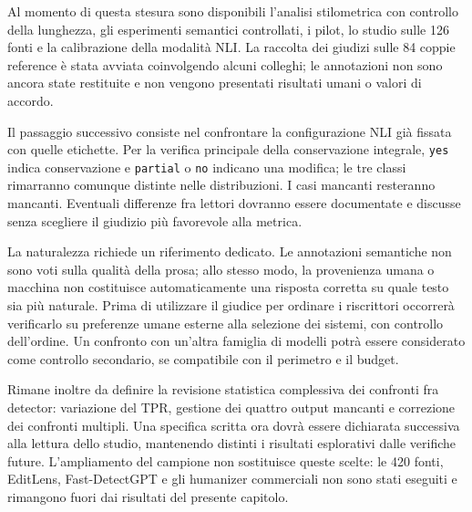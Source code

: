 \documentclass[11pt,a4paper]{article}
\begin{document}
Al momento di questa stesura sono disponibili l'analisi stilometrica con controllo della lunghezza, gli esperimenti semantici controllati, i pilot, lo studio sulle 126 fonti e la calibrazione della modalità NLI. La raccolta dei giudizi sulle 84 coppie reference è stata avviata coinvolgendo alcuni colleghi; le annotazioni non sono ancora state restituite e non vengono presentati risultati umani o valori di accordo.

Il passaggio successivo consiste nel confrontare la configurazione NLI già fissata con quelle etichette. Per la verifica principale della conservazione integrale, \texttt{yes} indica conservazione e \texttt{partial} o \texttt{no} indicano una modifica; le tre classi rimarranno comunque distinte nelle distribuzioni. I casi mancanti resteranno mancanti. Eventuali differenze fra lettori dovranno essere documentate e discusse senza scegliere il giudizio più favorevole alla metrica.

La naturalezza richiede un riferimento dedicato. Le annotazioni semantiche non sono voti sulla qualità della prosa; allo stesso modo, la provenienza umana o macchina non costituisce automaticamente una risposta corretta su quale testo sia più naturale. Prima di utilizzare il giudice per ordinare i riscrittori occorrerà verificarlo su preferenze umane esterne alla selezione dei sistemi, con controllo dell'ordine. Un confronto con un'altra famiglia di modelli potrà essere considerato come controllo secondario, se compatibile con il perimetro e il budget.

Rimane inoltre da definire la revisione statistica complessiva dei confronti fra detector: variazione del TPR, gestione dei quattro output mancanti e correzione dei confronti multipli. Una specifica scritta ora dovrà essere dichiarata successiva alla lettura dello studio, mantenendo distinti i risultati esplorativi dalle verifiche future. L'ampliamento del campione non sostituisce queste scelte: le 420 fonti, EditLens, Fast-DetectGPT e gli humanizer commerciali non sono stati eseguiti e rimangono fuori dai risultati del presente capitolo.
\end{document}
